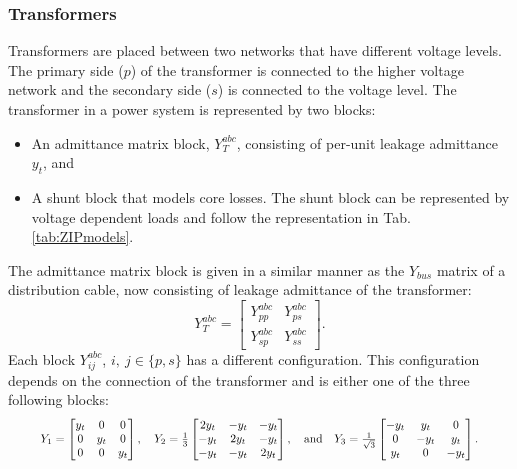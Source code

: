 \documentclass[10pt,journal]{article}
\begin{document}
\subsubsection{Transformers}
Transformers are placed between two networks that have different voltage levels. The primary side ($p$) of the transformer is connected to the higher voltage network and the secondary side ($s$) is connected to the voltage level. The transformer in a power system is represented by two blocks:
\begin{itemize}
    \item An admittance matrix block, $Y^{abc}_T$, consisting of per-unit leakage admittance $y_t$, and  
    \item A shunt block that models core losses. The shunt block can be represented by voltage dependent loads and follow the representation in Tab. \ref{tab:ZIPmodels}. 
\end{itemize}
The admittance matrix block is given in a similar manner as the $Y_{bus}$ matrix of a distribution cable, now consisting of leakage admittance of the transformer: \begin{equation}
    Y^{abc}_T = \begin{bmatrix}
    Y_{pp}^{abc} & Y^{abc}_{ps} \\
     Y_{sp}^{abc} & Y^{abc}_{ss}
    \end{bmatrix}.
\end{equation}
Each block $Y^{abc}_{ij}$, $i,\ j\in\{p,s\}$ has a different configuration. This configuration depends on the connection of the transformer and is either one of the three following blocks: \begin{equation}\resizebox{0.91\columnwidth}{!}{%
$
    Y_1=\begin{bmatrix}
    y_t & 0 & 0 \\
    0 & y_t & 0 \\
    0 & 0 & y_t
    \end{bmatrix},\quad Y_2=\frac{1}{3}\begin{bmatrix}
    2y_t & -y_t & -y_t \\
    -y_t & 2y_t & -y_t \\
    -y_t & -y_t & 2y_t
    \end{bmatrix},\quad\mbox{and}\quad Y_3=\frac{1}{\sqrt{3}}\begin{bmatrix}
    -y_t & y_t & 0 \\
    0 & -y_t & y_t \\
    y_t & 0 & -y_t 
    \end{bmatrix}. $%
    }
\end{equation}
\end{document}
